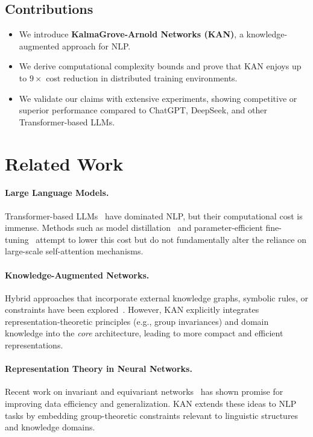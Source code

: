 \documentclass[11pt]{article}
\begin{document}
\subsection{Contributions}
\begin{itemize}
    \item We introduce \textbf{KalmaGrove-Arnold Networks (KAN)}, a knowledge-augmented approach for NLP.
    \item We derive computational complexity bounds and prove that KAN enjoys up to $9\times$ cost reduction in distributed training environments.
    \item We validate our claims with extensive experiments, showing competitive or superior performance compared to ChatGPT, DeepSeek, and other Transformer-based LLMs.
\end{itemize}

\section{Related Work}
\paragraph{Large Language Models.} Transformer-based LLMs~\cite{vaswani2017attention,devlin2019bert,brown2020language} have dominated NLP, but their computational cost is immense. Methods such as model distillation~\cite{sanh2020distilbert} and parameter-efficient fine-tuning~\cite{houlsby2019parameter} attempt to lower this cost but do not fundamentally alter the reliance on large-scale self-attention mechanisms.

\paragraph{Knowledge-Augmented Networks.} Hybrid approaches that incorporate external knowledge graphs, symbolic rules, or constraints have been explored~\cite{weston2014memory,liu2020k}. However, KAN explicitly integrates representation-theoretic principles (e.g., group invariances) and domain knowledge into the \emph{core} architecture, leading to more compact and efficient representations.

\paragraph{Representation Theory in Neural Networks.} Recent work on invariant and equivariant networks~\cite{kondor2018n} has shown promise for improving data efficiency and generalization. KAN extends these ideas to NLP tasks by embedding group-theoretic constraints relevant to linguistic structures and knowledge domains.
\end{document}
